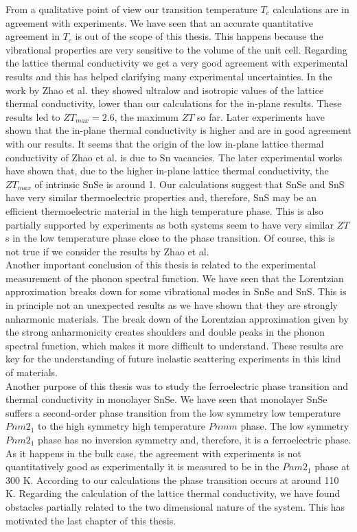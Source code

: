 From a qualitative point of view our transition temperature $T_{c}$ calculations are in agreement with experiments. 
We have seen that an accurate quantitative agreement in $T_{c}$ is out of the scope of this thesis. This happens 
because the vibrational properties are very sensitive to the volume of the unit cell. Regarding the lattice thermal 
conductivity we get a very good agreement with experimental results and this has helped clarifying many experimental 
uncertainties. In the work by Zhao et al.\cite{zhao2014ultralow} they showed ultralow and isotropic values of the 
lattice thermal conductivity, lower than our calculations for the in-plane results. These results led to 
$ZT_{max}=2.6$, the maximum $ZT$ so far. Later 
experiments\cite{ibrahim2017reinvestigation,wei2019thermoelectric} have shown that the in-plane thermal conductivity 
is higher and are in good agreement with our results. It seems that the origin of the low in-plane lattice thermal 
conductivity of Zhao et al. is due to Sn vacancies. The later experimental works have shown that, due to the higher 
in-plane lattice thermal conductivity, the $ZT_{max}$ of intrinsic SnSe is around 1. Our calculations suggest that 
SnSe and SnS have very similar thermoelectric properties and, therefore, SnS may be an efficient thermoelectric 
material in the high temperature phase. This is also partially supported by experiments as both systems seem to have 
very similar $ZT$s in the low temperature phase close to the phase transition. Of course, this is not true if we 
consider the results by Zhao et al. \\

Another important conclusion of this thesis is related to the experimental measurement of the phonon spectral 
function. We have seen that the Lorentzian approximation breaks down for some vibrational modes in SnSe and SnS. 
This is in principle not an unexpected results as we have shown that they are strongly anharmonic materials. The 
break down of the Lorentzian approximation given by the strong anharmonicity creates shoulders and double peaks in 
the phonon spectral function, which makes it more difficult to understand. These results are key for the 
understanding of future inelastic scattering experiments in this kind of materials. \\

Another purpose of this thesis was to study the ferroelectric phase transition and thermal conductivity in monolayer 
SnSe. We have seen that monolayer SnSe suffers a second-order phase transition from the low symmetry low temperature 
$Pnm2_{1}$ to the high symmetry high temperature $Pnmm$ phase. The low symmetry $Pnm2_{1}$ phase has no inversion 
symmetry and, therefore, it is a ferroelectric phase. As it happens in the bulk case, the agreement with 
experiments is not quantitatively good as experimentally it is measured to be in the $Pnm2_{1}$ phase at 300 K. 
According to our calculations the phase transition occurs at around 110 K. Regarding the calculation of the lattice 
thermal conductivity, we have found obstacles partially related to the two dimensional nature of the system. This has 
motivated the last chapter of this thesis. \\

